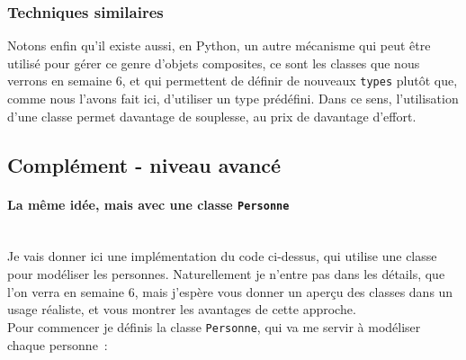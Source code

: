     \hypertarget{techniques-similaires}{%
\subsubsection{Techniques similaires}\label{techniques-similaires}}

    Notons enfin qu'il existe aussi, en Python, un autre mécanisme qui peut
être utilisé pour gérer ce genre d'objets composites, ce sont les
classes que nous verrons en semaine 6, et qui permettent de définir de
nouveaux \texttt{types} plutôt que, comme nous l'avons fait ici,
d'utiliser un type prédéfini. Dans ce sens, l'utilisation d'une classe
permet davantage de souplesse, au prix de davantage d'effort.

    \hypertarget{compluxe9ment---niveau-avancuxe9}{%
\subsection{Complément - niveau
avancé}\label{compluxe9ment---niveau-avancuxe9}}

    \hypertarget{la-muxeame-iduxe9e-mais-avec-une-classe-personne}{%
\paragraph{\texorpdfstring{La même idée, mais avec une classe
\texttt{Personne}}{La même idée, mais avec une classe Personne}\\\\}\label{la-muxeame-iduxe9e-mais-avec-une-classe-personne}}

    Je vais donner ici une implémentation du code ci-dessus, qui utilise une
classe pour modéliser les personnes. Naturellement je n'entre pas dans
les détails, que l'on verra en semaine 6, mais j'espère vous donner un
aperçu des classes dans un usage réaliste, et vous montrer les avantages
de cette approche.\\

    Pour commencer je définis la classe \texttt{Personne}, qui va me servir
à modéliser chaque personne~:

